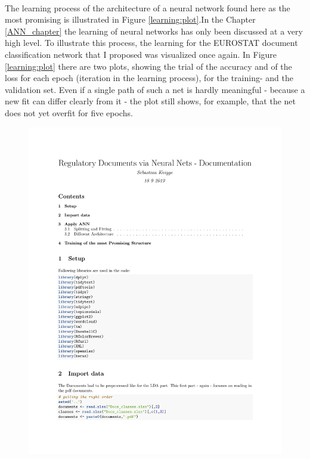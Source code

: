 \documentclass[11pt,a4paper]{article}
\begin{document}
\ \\
The learning process of the architecture of a neural network found here as the most promising is illustrated in Figure \ref{learning:plot}.In the Chapter \ref{ANN_chapter} the learning of neural networks has only been discussed at a very high level. To illustrate this process, the learning for the EUROSTAT document classification network that I proposed was visualized once again. In Figure \ref{learning:plot} there are two plots, showing the trial of the accuracy and of the loss for each epoch (iteration in the learning process), for the training- and the validation set. Even if a single path of such a net is hardly meaningful - because a new fit can differ clearly from it - the plot still shows, for example, that the net does not yet overfit for five epochs.\\
\begin{figure}[!htbp]
	\centering
	\includegraphics[page=8, trim=68 400 10 80,clip,width=1\textwidth]{ANN_RegDocs.pdf}

\end{figure}
\end{document}
